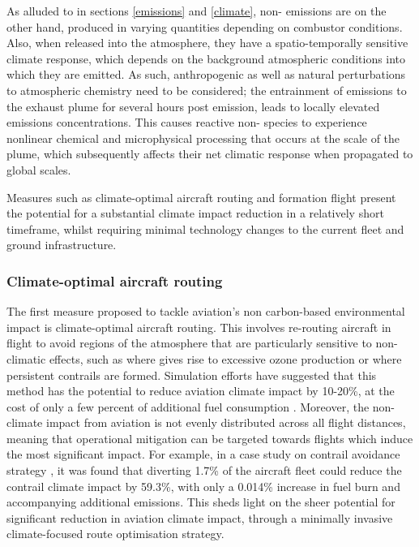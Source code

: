 As alluded to in sections \ref{emissions} and \ref{climate}, non- emissions are on the other hand, produced in varying quantities depending on combustor conditions. Also, when released into the atmosphere, they have a spatio-temporally sensitive climate response, which depends on the background atmospheric conditions into which they are emitted. As such, anthropogenic as well as natural perturbations to atmospheric chemistry need to be considered; the entrainment of emissions to the exhaust plume for several hours post emission, leads to locally elevated emissions concentrations. This causes reactive non- species to experience nonlinear chemical and microphysical processing that occurs at the scale of the plume, which subsequently affects their net climatic response when propagated to global scales.

Measures such as climate-optimal aircraft routing and formation flight present the potential for a substantial climate impact reduction in a relatively short timeframe, whilst requiring minimal technology changes to the current fleet and ground infrastructure.


\subsubsection{Climate-optimal aircraft routing}
The first measure proposed to tackle aviation’s non carbon-based environmental impact is climate-optimal aircraft routing. This involves re-routing aircraft in flight to avoid regions of the atmosphere that are particularly sensitive to non- climatic effects, such as where  gives rise to excessive ozone production or where persistent contrails are formed. Simulation efforts have suggested that this method has the potential to reduce aviation climate impact by 10-20\%, at the cost of only a few percent of additional fuel consumption \cite{Grewe2014, Luhrs2016, Niklass2019a}. Moreover, the non- climate impact from aviation is not evenly distributed across all flight distances, meaning that operational mitigation can be targeted towards flights which induce the most significant impact. For example, in a case study on contrail avoidance strategy \cite{Teoh2020}, it was found that diverting 1.7\% of the aircraft fleet could reduce the contrail climate impact by 59.3\%, with only a 0.014\% increase in fuel burn and accompanying additional  emissions. This sheds light on the sheer potential for significant reduction in aviation climate impact, through a minimally invasive climate-focused route optimisation strategy.

